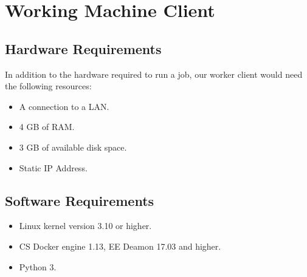   \section{Working Machine Client}
    \subsection{Hardware Requirements}
      In addition to the hardware required to run a job, our worker client would need the following resources:
    \begin{itemize}
      \item A connection to a LAN.
      \item 4 GB of RAM.
      \item 3 GB of available disk space.
      \item Static IP Address.
    \end{itemize}
    \subsection{Software Requirements}
    \begin{itemize}
      \item Linux kernel version 3.10 or higher.
      \item CS Docker engine 1.13, EE Deamon 17.03 and higher.
      \item Python 3.
    \end{itemize}

